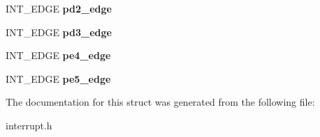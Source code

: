 \begin{DoxyCompactItemize}
\mbox{\label{structINT__REG__CALLBACK_a31612e0ddabf4d61a86ab87a4e70b97e}} 
I\+N\+T\+\_\+\+E\+D\+GE {\bfseries pd2\+\_\+edge}
\item 
\mbox{\label{structINT__REG__CALLBACK_ad6405304b424fe3dc843c17582538633}} 
I\+N\+T\+\_\+\+E\+D\+GE {\bfseries pd3\+\_\+edge}
\item 
\mbox{\label{structINT__REG__CALLBACK_a56c033a69ca99c16108e525437dc55c3}} 
I\+N\+T\+\_\+\+E\+D\+GE {\bfseries pe4\+\_\+edge}
\item 
\mbox{\label{structINT__REG__CALLBACK_ad192d736896bae445961e765a3ee816c}} 
I\+N\+T\+\_\+\+E\+D\+GE {\bfseries pe5\+\_\+edge}
\end{DoxyCompactItemize}


The documentation for this struct was generated from the following file\+:\begin{DoxyCompactItemize}
\item 
interrupt.\+h\end{DoxyCompactItemize}
